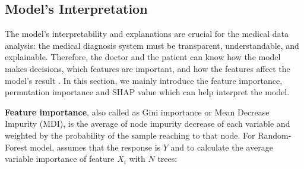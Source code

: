 \documentclass{article}
\begin{document}
\begin{comment}
\subsection{Classification Strategy}
In solving a multi-class classification problem, converting it into multi-binary classifications is an intuitive way to simplify the computation. Generally speaking, there are two strategies in do the converting \cite{rifkin2004defense}:
\begin{enumerate}
    \setlength{\itemsep}{0pt}
    \setlength{\parsep}{0pt}
    \setlength{\parskip}{0pt}
    \item One-vs.-Rest (or One-vs.-All, OvR)
    \item One-vs.One (or OvO)
\end{enumerate}

For the ``One-vs.-rest", categories would be one-hot encoded. Rather than just building one multi-class model, OvR needs $n$ classifiers for $n$ categories. For each data-points, it gets $n$ labels from those classifiers. Then we would use the label with the highest score as the predicted label for this sample. This method is commonly used in those machine learning models that can predict the score for the prediction such as Logistic Regression, Random Forest.

The aim of ``One-vs.-One" is to construct multiple binary classifiers between any two types of samples. If we have $n$ categories, the OvO needs $\frac{n(n-1)}{2}$ classifiers in total and for each classifier, we would have a predicted label based on the classifier. Based on those labels for a sample, we can use the hard-voting or soft-voting to distinguish which class the sample is in. This strategy is commonly used in linear models like Support Vector Machines(SVM) and Decision trees.
\end{comment}

\subsection{Model's Interpretation}\label{Model's Interpretation}

The model's interpretability and explanations are crucial for the medical data analysis: the medical diagnosis system must be transparent, understandable, and explainable. Therefore, the doctor and the patient can know how the model makes decisions, which features are important, and how the features affect the model's result \cite{ahmad2018interpretable, molnar2020interpretable}. In this section, we mainly introduce the feature importance, permutation importance and SHAP value which can help interpret the model.
\\
\par\noindent\textbf{Feature importance}, also called as Gini importance or Mean Decrease Impurity (MDI)\cite{breiman2001random,archer2008empirical, scikit-learn}, is the average of node impurity decrease of each variable and weighted by the probability of the sample reaching to that node. For Random-Forest model, assumes that the response is $Y$ and to calculate the average variable importance of feature $X_i$ with $N$ trees:
\end{document}
